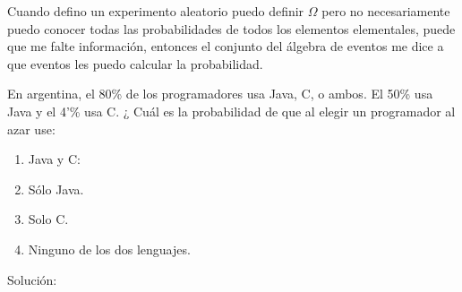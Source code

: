 \documentclass[../main.tex]{subfiles}
\begin{document}
\begin{note}
    Cuando defino un experimento aleatorio puedo definir $\Omega$ pero no necesariamente puedo conocer todas las probabilidades de todos los elementos elementales, puede que me falte información, entonces el conjunto del álgebra de eventos me dice a que eventos les puedo calcular la probabilidad.
\end{note}

\begin{example*}
    En argentina, el 80\% de los programadores usa Java, C, o ambos. El 50\% usa Java y el 4'\% usa C. ¿ Cuál es la probabilidad de que al elegir un programador al azar use:
    \begin{enumerate}[label=\alph*)]
        \item Java y C:
        \item Sólo Java.
        \item Solo C.
        \item Ninguno de los dos lenguajes.
    \end{enumerate}

    Solución:


\end{example*}
\end{document}
